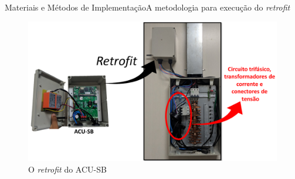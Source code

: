 \begin{frame}{Materiais e Métodos de Implementação}{A metodologia para execução do \textit{retrofit}}
\vspace{-0.64cm}
\begin{figure}[htp]
	\centering
	\caption{ \centering\small{{O \textit{retrofit} do ACU-SB}}}
	\includegraphics[width=0.95\linewidth]{img/retro_sb.png}
    \hspace{5cm}
    \vspace{1cm}
\end{figure}
\end{frame}
